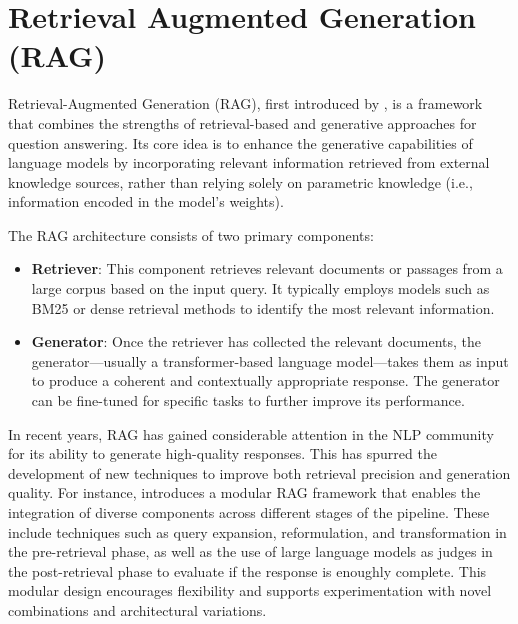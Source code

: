 \section{Retrieval Augmented Generation (RAG)}

Retrieval-Augmented Generation (RAG), first introduced by \cite{RAG2021}, is a framework that combines the strengths of retrieval-based and generative approaches for question answering. Its core idea is to enhance the generative capabilities of language models by incorporating relevant information retrieved from external knowledge sources, rather than relying solely on parametric knowledge (i.e., information encoded in the model’s weights).

The RAG architecture consists of two primary components: 
\begin{itemize}
     
    \item \textbf{Retriever}: This component retrieves relevant documents or passages from a large corpus based on the input query. It typically employs models such as BM25 or dense retrieval methods to identify the most relevant information. 
    \item \textbf{Generator}: Once the retriever has collected the relevant documents, the generator—usually a transformer-based language model—takes them as input to produce a coherent and contextually appropriate response. The generator can be fine-tuned for specific tasks to further improve its performance. 
\end{itemize}

In recent years, RAG has gained considerable attention in the NLP community for its ability to generate high-quality responses. This has spurred the development of new techniques to improve both retrieval precision and generation quality. For instance, \cite{modularRAG2024} introduces a modular RAG framework that enables the integration of diverse components across different stages of the pipeline. These include techniques such as query expansion, reformulation, and transformation in the pre-retrieval phase, as well as the use of large language models as judges in the post-retrieval phase to evaluate if the response is enoughly complete.
This modular design encourages flexibility and supports experimentation with novel combinations and architectural variations.








